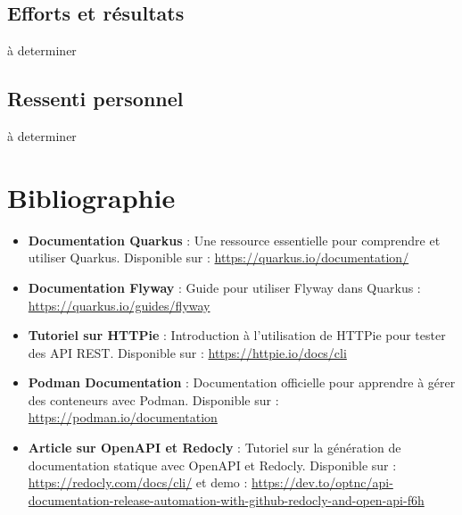 \documentclass{article}
\begin{document}
	\subsection{Efforts et résultats}
	
	à determiner
	
	\subsection{Ressenti personnel}
	
	à determiner
	
	\newpage
	\section{Bibliographie}
	\begin{itemize}
		\item \textbf{Documentation Quarkus} : Une ressource essentielle pour comprendre et utiliser Quarkus. Disponible sur : \url{https://quarkus.io/documentation/}
		\item \textbf{Documentation Flyway} : Guide pour utiliser Flyway dans Quarkus : \url{https://quarkus.io/guides/flyway}
		\item \textbf{Tutoriel sur HTTPie} : Introduction à l'utilisation de HTTPie pour tester des API REST. Disponible sur : \url{https://httpie.io/docs/cli}
		\item \textbf{Podman Documentation} : Documentation officielle pour apprendre à gérer des conteneurs avec Podman. Disponible sur : \url{https://podman.io/documentation}
		\item \textbf{Article sur OpenAPI et Redocly} : Tutoriel sur la génération de documentation statique avec OpenAPI et Redocly. Disponible sur : \url{https://redocly.com/docs/cli/} et demo : \url{https://dev.to/optnc/api-documentation-release-automation-with-github-redocly-and-open-api-f6h}
	\end{itemize}
	
\end{document}
